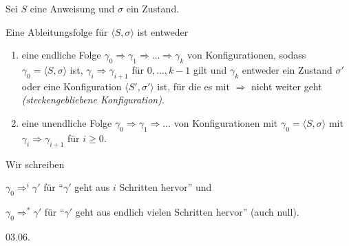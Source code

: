 \begin{definition}
    Sei $S$ eine Anweisung und $\sigma$ ein Zustand.

    Eine Ableitungsfolge für $\langle S, \sigma \rangle$ ist entweder
    \begin{enumerate}
        \item eine endliche Folge $\gamma_0 \Rightarrow \gamma_1 \Rightarrow \dots \Rightarrow \gamma_k$ von Konfigurationen, sodass $\gamma_0 = \langle S, \sigma \rangle$ ist, $\gamma_i \Rightarrow \gamma_{i+1}$ für $0, \dots, k-1$ gilt und $\gamma_k$ entweder ein Zustand $\sigma'$ oder eine Konfiguration $\langle S', \sigma' \rangle$ ist, für die es mit $\Rightarrow$ nicht weiter geht \emph{(steckengebliebene Konfiguration)}.

        \item eine unendliche Folge $\gamma_0 \Rightarrow \gamma_1 \Rightarrow \dots$ von Konfigurationen mit $\gamma_0 = \langle S, \sigma \rangle$ mit $\gamma_i \Rightarrow \gamma_{i+1}$ für $i \geq 0$.
    \end{enumerate}
\end{definition}

\par\medskip
\begin{notation}
    Wir schreiben

    $\gamma_0 \Rightarrow^i \gamma'$ für ``$\gamma'$ geht aus $i$ Schritten hervor'' und

    $\gamma_0 \Rightarrow^* \gamma'$ für ``$\gamma'$ geht aus endlich vielen Schritten hervor'' (auch null).
\end{notation}



\newpage
\hfill 03.06.

